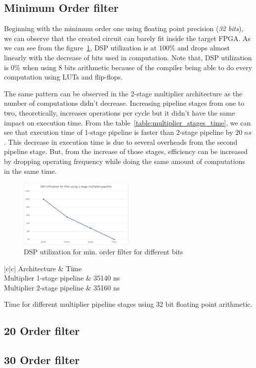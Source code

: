 \subsection{Minimum Order filter}
Beginning with the minimum order one using floating point precision (\textit{32 bits}), we can observe that the created circuit can barely fit inside the target FPGA. As we can see from the figure~\ref{fig:fir_min_dsp_util}, DSP utilization is at $100\%$ and drops almost linearly with the decrease of bits used in computation. Note that, DSP utilization is $0\%$ when using 8 bits arithmetic because of the compiler being able to do every computation using LUTs and flip-flops.

The same pattern can be observed in the 2-stage multiplier architecture as the number of computations didn't decrease. Increasing pipeline stages from one to two, theoretically, increases operations per cycle but it didn't have the same impact on execution time. From the table~\ref{table:multiplier_stages_time}, we can see that execution time of 1-stage pipeline is faster than 2-stage pipeline by $20\hspace{3pt}ns$. This decrease in execution time is due to several overheads from the second pipeline stage. But, from the increase of those stages, efficiency can be increased by dropping operating frequency while doing the same amount of computations in the same time.

\begin{figure}[htbp]
	\centering
	\includegraphics[width=0.5\textwidth]{../Images/FIR_min_Order/multiplier_1_pipeline/dsp_util.png}
	\caption{DSP utilization for min. order filter for different bits}
	\label{fig:fir_min_dsp_util}
\end{figure}

\begin{table}[htbp]
\centering
\begin{tblr}{|c|c|}
	\hline
	Architecture & Time \\
	\hline
	{Multiplier 1-stage pipeline} & 35140 ns\\
	\hline
	{Multiplier 2-stage pipeline} & 35160 ns\\
	\hline
\end{tblr}
\caption{Time for different multiplier pipeline stages using 32 bit floating point arithmetic.}
\label{table:multiplier_stages_time}
\end{table}

\subsection{20 Order filter}

\subsection{30 Order filter}
